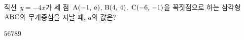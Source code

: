 직선~$y=-4x$가 세 점~$\mathrm{A}(-1,\,a)$, $\mathrm{B}(4,\,4)$, $\mathrm{C}(-6,\,-1)$을 꼭짓점으로 하는 삼각형~$\mathrm{ABC}$의 무게중심을 지날 때, $a$의 값은?
\begin{choices32}{$5$}{$6$}{$7$}{$8$}{$9$}\end{choices32}
